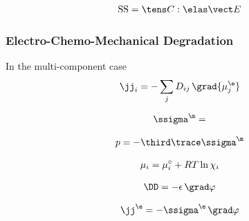 \begin{align}
  \SS = \CCCC:\EEe
\end{align}

\subsubsection{Electro-Chemo-Mechanical Degradation}




In the multi-component case 
\begin{align}
  \jj_i = -\sum_j D_{ij} \, \grad{\mu_j^\e}
\end{align}

\begin{align}
  \ssigma^\m = 
\end{align}

\begin{align}
  p = -\third\trace\ssigma^\m
\end{align}

\begin{align}
  \mu_i = \mu_{i}^{\circ} + RT \ln{\chi_i}
\end{align}

\begin{align}
  \DD = -\epsilon \, \grad \varphi
\end{align}

\begin{align}
  \jj^\e = -\ssigma^\e \, \grad \varphi
\end{align}
